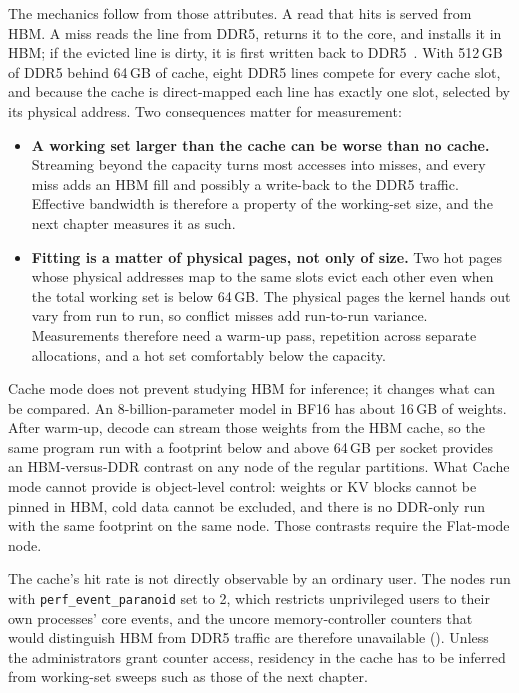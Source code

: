 The mechanics follow from those attributes.  A read that hits is served
from HBM.  A miss reads the line from DDR5, returns it to the core, and
installs it in HBM; if the evicted line is dirty, it is first written
back to DDR5~\cite{intelmaxoverview}.  With 512\,GB of DDR5 behind 64\,GB
of cache, eight DDR5 lines compete for every cache slot, and because the
cache is direct-mapped each line has exactly one slot, selected by its
physical address.  Two consequences matter for measurement:

\begin{itemize}
  \item \textbf{A working set larger than the cache can be worse than no
        cache.}  Streaming beyond the capacity turns most accesses into
        misses, and every miss adds an HBM fill and possibly a write-back
        to the DDR5 traffic.  Effective bandwidth is therefore a property
        of the working-set size, and the next chapter measures it as
        such.
  \item \textbf{Fitting is a matter of physical pages, not only of
        size.}  Two hot pages whose physical addresses map to the same
        slots evict each other even when the total working set is below
        64\,GB.  The physical pages the kernel hands out vary from run to
        run, so conflict misses add run-to-run variance.  Measurements
        therefore need a warm-up pass, repetition across separate
        allocations, and a hot set comfortably below the capacity.
\end{itemize}

Cache mode does not prevent studying HBM for inference; it changes what
can be compared.  An 8-billion-parameter model in BF16 has about 16\,GB of
weights.  After warm-up, decode can stream those weights from the HBM
cache, so the same program run with a footprint below and above 64\,GB
per socket provides an HBM-versus-DDR contrast on any node of the
regular partitions.  What Cache mode cannot provide is object-level
control: weights or KV blocks cannot be pinned in HBM, cold data cannot
be excluded, and there is no DDR-only run with the same footprint on the
same node.  Those contrasts require the Flat-mode node.

The cache's hit rate is not directly observable by an ordinary user.  The
nodes run with \texttt{perf\_event\_paranoid} set to 2, which restricts
unprivileged users to their own processes' core events, and the uncore
memory-controller counters that would distinguish HBM from DDR5 traffic
are therefore unavailable ().  Unless the
administrators grant counter access, residency in the cache has to be
inferred from working-set sweeps such as those of the next chapter.

